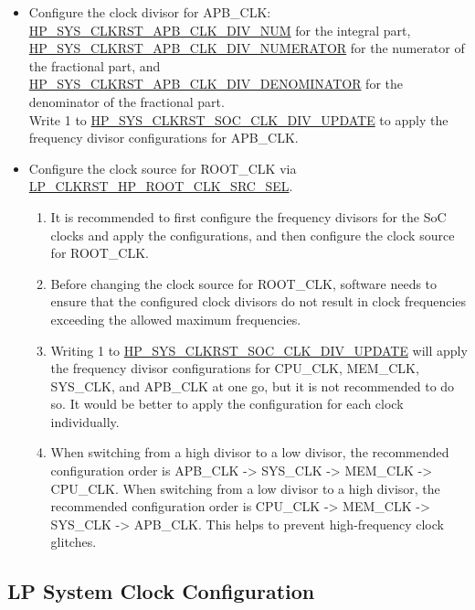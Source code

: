 \documentclass[main\_\_EN.tex]{subfiles}
\begin{document}
\begin{itemize}
    \item Configure the clock divisor for APB\_CLK: \hyperref[fielddesc:HPSYSCLKRSTAPBCLKDIVNUM]{HP\_SYS\_CLKRST\_APB\_CLK\_DIV\_NUM} for the integral part, \hyperref[fielddesc:HPSYSCLKRSTAPBCLKDIVNUMERATOR]{HP\_SYS\_CLKRST\_APB\_CLK\_DIV\_NUMERATOR} for the numerator of the fractional part, and \hyperref[fielddesc:HPSYSCLKRSTAPBCLKDIVDENOMINATOR]{HP\_SYS\_CLKRST\_APB\_CLK\_DIV\_DENOMINATOR} for the denominator of the fractional part.\\
    Write 1 to \hyperref[fielddesc:HPSYSCLKRSTSOCCLKDIVUPDATE]{HP\_SYS\_CLKRST\_SOC\_CLK\_DIV\_UPDATE} to apply the frequency divisor configurations for APB\_CLK.
    \item Configure the clock source for ROOT\_CLK via \hyperref[fielddesc:LPCLKRSTHPROOTCLKSRCSEL]{LP\_CLKRST\_HP\_ROOT\_CLK\_SRC\_SEL}.\\

     \begin{importantlisting}
      \vspace{-0.5em}
      \begin{enumerate}
        \item It is recommended to first configure the frequency divisors for the SoC clocks and apply the configurations, and then configure the clock source for ROOT\_CLK.
        \item Before changing the clock source for ROOT\_CLK, software needs to ensure that the configured clock divisors do not result in clock frequencies exceeding the allowed maximum frequencies.
        \item Writing 1 to \hyperref[fielddesc:HPSYSCLKRSTSOCCLKDIVUPDATE]{HP\_SYS\_CLKRST\_SOC\_CLK\_DIV\_UPDATE} will apply the frequency divisor configurations for CPU\_CLK, MEM\_CLK, SYS\_CLK, and APB\_CLK at one go, but it is not recommended to do so. It would be better to apply the configuration for each clock individually.
        \item When switching from a high divisor to a low divisor, the recommended configuration order is APB\_CLK -> SYS\_CLK -> MEM\_CLK -> CPU\_CLK. When switching from a low divisor to a high divisor, the recommended configuration order is CPU\_CLK -> MEM\_CLK -> SYS\_CLK -> APB\_CLK. This helps to prevent high-frequency clock glitches.
        \end{enumerate}
      \end{importantlisting}
\end{itemize}


\subsection{LP System Clock Configuration}
\end{document}
